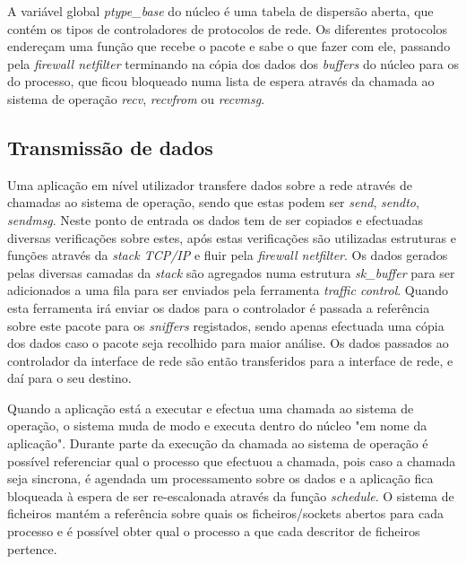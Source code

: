 



A variável global \textit{ptype\_base} do núcleo é uma tabela de dispersão aberta, que contém os tipos de controladores de protocolos de rede. Os diferentes protocolos endereçam uma função que recebe o pacote e sabe o que fazer com ele, passando pela \textit{firewall netfilter} terminando na cópia dos dados dos \textit{buffers} do núcleo para os do processo, que ficou bloqueado numa lista de espera através da chamada ao sistema de operação \textit{recv}, \textit{recvfrom} ou \textit{recvmsg}.

\subsection{Transmissão de dados}

Uma aplicação em nível utilizador transfere dados sobre a rede através de chamadas ao sistema de operação, sendo que estas podem ser \textit{send}, \textit{sendto}, \textit{sendmsg}.
 Neste ponto de entrada os dados tem de ser copiados e efectuadas diversas verificações sobre estes, após estas verificações são utilizadas estruturas e funções através da \textit{stack TCP/IP} e fluir pela \textit{firewall netfilter}.
 Os dados gerados pelas diversas camadas da \textit{stack} são agregados numa estrutura \textit{sk\_buffer} para ser adicionados a uma fila para ser enviados pela ferramenta \textit{traffic control}.
 Quando esta ferramenta irá enviar os dados para o controlador é passada a referência sobre este pacote para os \textit{sniffers} registados, sendo apenas efectuada uma cópia dos dados caso o pacote seja recolhido para maior análise. Os dados passados ao controlador da interface de rede são então transferidos para a interface de rede, e daí para o seu destino.

Quando a aplicação está a executar e efectua uma chamada ao sistema de operação, o sistema muda de modo e executa dentro do núcleo "em nome da aplicação".
 Durante parte da execução da chamada ao sistema de operação é possível referenciar qual o processo que efectuou a chamada, pois caso a chamada seja sincrona, é agendada um processamento sobre os dados e a aplicação fica bloqueada à espera de ser re-escalonada através da função \textit{schedule}.
 O sistema de ficheiros mantém a referência sobre quais os ficheiros/sockets abertos para cada processo e é possível obter qual o processo a que cada descritor de ficheiros pertence. %

